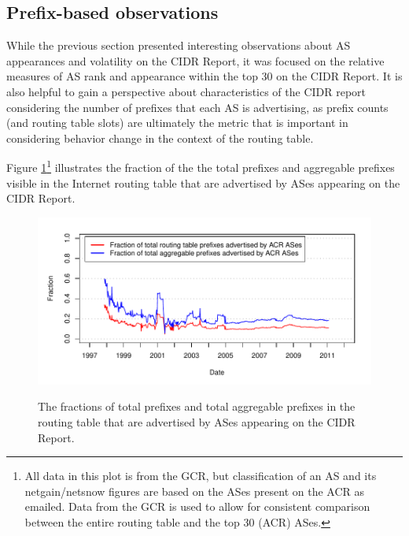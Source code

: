 \subsection{Prefix-based observations}


While the previous section presented interesting observations about AS
appearances and volatility on the CIDR Report, it was focused on the relative
measures of AS rank and appearance within the top 30 on the CIDR Report. It is
also helpful to gain a perspective about characteristics of the CIDR report
considering the number of prefixes that each AS is advertising, as prefix
counts (and routing table slots) are ultimately the metric that is important in
considering behavior change in the context of the routing table.

Figure \ref{fig:netcompare}\footnote{All data in this plot is from the GCR, but
classification of an AS and its netgain/netsnow figures are based on the ASes
present on the ACR as emailed. Data from the GCR is used to allow for
consistent comparison between the entire routing table and the top 30 (ACR)
ASes.} illustrates the fraction of the the total prefixes and aggregable
prefixes visible in the Internet routing table that are advertised by ASes
appearing on the CIDR Report.

\begin{figure}[h!]
\begin{centering}
\begin{singlespace}
    \includegraphics[width=6in]{figures/acr_gcr_netcompare2.pdf}
    \vspace{-2em}\\
    \caption{The fractions of total prefixes and total aggregable
    prefixes in the routing table that are advertised by ASes appearing on the
    CIDR Report.}
    \label{fig:netcompare}
\end{singlespace}
\end{centering}
\end{figure}

